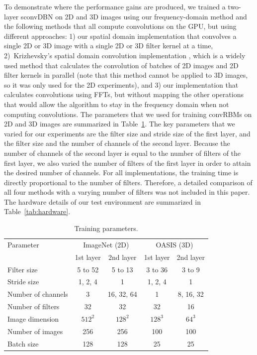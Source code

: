 To demonstrate where the performance gains are produced, we trained a two-layer
sconvDBN on 2D and 3D images using our frequency-domain method and the following
methods that all compute convolutions on the GPU, but using different
approaches: 1) our spatial domain implementation that convolves a single 2D or
3D image with a single 2D or 3D filter kernel at a time, 2)~Krizhevsky's spatial
domain convolution implementation \citep{Krizhevsky2012b}, which is a widely
used method \citep[e.g.,][]{scherer2010,hinton2012,zeiler2013} that calculates
the convolution of batches of 2D images and 2D filter kernels in parallel (note
that this method cannot be applied to 3D images, so it was only used for the 2D
experiments), and 3) our implementation that calculates convolutions using FFTs,
but without mapping the other operations that would allow the algorithm to stay
in the frequency domain when not computing convolutions. The parameters that we
used for training convRBMs on 2D and 3D images are summarized in
Table~\ref{tab:parameters}. The key parameters that we varied for our
experiments are the filter size and stride size of the first layer, and the
filter size and the number of channels of the second layer.
Because the number of channels of the second layer is equal to the number of
filters of the first layer, we also varied the number of filters of the first
layer in order to attain the desired number of channels. For all
implementations, the training time is directly proportional to the number of
filters. Therefore, a detailed comparison of all four methods with a varying
number of filters was not included in this paper. The hardware details of our
test environment are summarized in Table~\ref{tab:hardware}.

\begin{table}
\centering
\caption{Training parameters.}
\begin{tabular}{lcccc}
\toprule
Parameter & \multicolumn{2}{c}{ImageNet (2D)} & \multicolumn{2}{c}{OASIS (3D)}
\\
\addlinespace
 & \multicolumn{1}{c}{1st layer} & \multicolumn{1}{c}{2nd layer} 
 & \multicolumn{1}{c}{1st layer} & \multicolumn{1}{c}{2nd layer} \\
\cmidrule(r){1-1} \cmidrule(lr){2-2} \cmidrule(lr){3-3} \cmidrule(lr){4-4}
\cmidrule(l){5-5}
Filter size & 5 to 52 & 5 to 13 & 3 to 36 & 3 to 9 \\
Stride size & 1, 2, 4 & 1 & 1, 2, 4 & 1 \\
Number of channels & 3 & 16, 32, 64 & 1 & 8, 16, 32 \\
Number of filters & 32 & 32 & 32 & 16 \\
Image dimension & $512^2$ & $128^2$ & $128^3$ & $64^3$ \\
Number of images & 256 & 256 & 100 & 100 \\
Batch size & 128 & 128 & 25 & 25 \\
\bottomrule
\end{tabular}
\label{tab:parameters}
\end{table}

